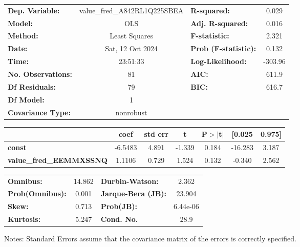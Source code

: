 \begin{center}
\begin{tabular}{lclc}
\toprule
\textbf{Dep. Variable:}         & value\_fred\_A842RL1Q225SBEA & \textbf{  R-squared:         } &     0.029   \\
\textbf{Model:}                 &             OLS              & \textbf{  Adj. R-squared:    } &     0.016   \\
\textbf{Method:}                &        Least Squares         & \textbf{  F-statistic:       } &     2.321   \\
\textbf{Date:}                  &       Sat, 12 Oct 2024       & \textbf{  Prob (F-statistic):} &    0.132    \\
\textbf{Time:}                  &           23:51:33           & \textbf{  Log-Likelihood:    } &   -303.96   \\
\textbf{No. Observations:}      &                81            & \textbf{  AIC:               } &     611.9   \\
\textbf{Df Residuals:}          &                79            & \textbf{  BIC:               } &     616.7   \\
\textbf{Df Model:}              &                 1            & \textbf{                     } &             \\
\textbf{Covariance Type:}       &          nonrobust           & \textbf{                     } &             \\
\bottomrule
\end{tabular}
\begin{tabular}{lcccccc}
                                & \textbf{coef} & \textbf{std err} & \textbf{t} & \textbf{P$> |$t$|$} & \textbf{[0.025} & \textbf{0.975]}  \\
\midrule
\textbf{const}                  &      -6.5483  &        4.891     &    -1.339  &         0.184        &      -16.283    &        3.187     \\
\textbf{value\_fred\_EEMMXSSNQ} &       1.1106  &        0.729     &     1.524  &         0.132        &       -0.340    &        2.562     \\
\bottomrule
\end{tabular}
\begin{tabular}{lclc}
\textbf{Omnibus:}       & 14.862 & \textbf{  Durbin-Watson:     } &    2.362  \\
\textbf{Prob(Omnibus):} &  0.001 & \textbf{  Jarque-Bera (JB):  } &   23.904  \\
\textbf{Skew:}          &  0.713 & \textbf{  Prob(JB):          } & 6.44e-06  \\
\textbf{Kurtosis:}      &  5.247 & \textbf{  Cond. No.          } &     28.9  \\
\bottomrule
\end{tabular}
\end{center}

Notes: \newline
 [1] Standard Errors assume that the covariance matrix of the errors is correctly specified.